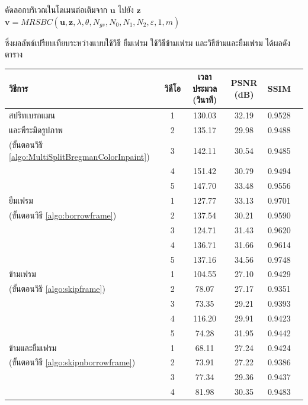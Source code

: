 \documentclass[hidelinks, a4paper,12pt]{article}
\numberwithin{equation}{section}							%
\numberwithin{equation}{section}
\begin{document}
{\begin{algorithm}[H]
{{				คัดลอกบริเวณในโดเมนต่อเติมจาก $\boldsymbol{u} $ ไปยัง $\boldsymbol{z}$\\
				$\boldsymbol{v} = MRSBC(\boldsymbol{u} ,\boldsymbol{z} ,\lambda, \theta, N_{gs}, N_0, N_1, N_2, \varepsilon,1,m)$
			}
		}	
	\end{algorithm}
	\vspace{0.5cm}
	\hspace{1cm}ซึ่งผลลัพธ์เปรียบเทียบระหว่างแบบใช้วิธี ยืมเฟรม ใช้วิธีข้ามเฟรม และวิธีข้ามและยืมเฟรม ได้ผลดังตาราง
		\begin{table}[H]
		\small
		\centering
		\begin{tabular}[ht]{|l|c|c|c|c|c|}
			\hline
			วิธีการ  & วิดีโอ &เวลาประมวล  (วินาที) & PSNR (dB) & SSIM \\
			\hline
			สปริทเบรกแมน & 1 & 130.03  & 32.19 & 0.9528  \\ 
			และพีระมิดรูปภาพ& 2 & 135.17 & 29.98 & 0.9488 \\
			(ขั้นตอนวิธี \ref{algo:MultiSplitBregmanColorInpaint})& 3 & 142.11 & 30.54 & 0.9485 \\
			& 4 & 151.42 & 30.79 & 0.9494 \\
			& 5 & 147.70 & 33.48 & 0.9556 \\
			\hline
			ยืมเฟรม & 1 & 127.77  & 33.13& 0.9701 \\ 
			(ขั้นตอนวิธี \ref{algo:borrowframe})& 2 & 137.54 & 30.21 & 0.9590 \\
			& 3 & 124.71 & 31.43 & 0.9620 \\
			& 4 & 136.71 & 31.66 & 0.9614 \\
			& 5 & 137.16 & 34.56 &  0.9748 \\
			\hline
			ข้ามเฟรม & 1 &  104.55 & 27.10 &  0.9429\\ 
			(ขั้นตอนวิธี \ref{algo:skipframe})& 2 & 78.07 & 27.17 & 0.9351 \\
			& 3 & 73.35 & 29.21 & 0.9393\\
			& 4 & 116.20 & 29.91 & 0.9423 \\
			& 5 & 74.28 & 31.95 &  0.9442\\
			\hline
			ข้ามและยืมเฟรม & 1 & 68.11 & 27.24 & 0.9424 \\ 
			(ขั้นตอนวิธี \ref{algo:skipnborrowframe})& 2 & 73.91 & 27.22 & 0.9386 \\
			& 3 & 77.34 & 29.36 & 0.9437 \\
			& 4 & 81.98 & 30.35 & 0.9483  \\

\end{tabular}
\end{table}}
\end{document}
